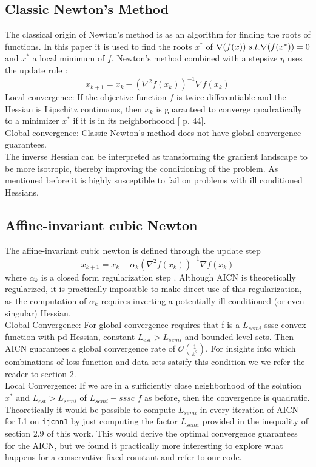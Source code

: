 \documentclass{article}
\begin{document}
\subsection{Classic Newton's Method}
The classical origin of Newton's method is as an algorithm for finding the roots of functions. In this paper it is used to find the roots $x^{*}$ of $\nabla (f(x)) \hspace{0.1cm} s.t.\nabla(f(x^{*})) = 0$ and $x^{*}$ a local minimum of $f$. Newton's method combined with a stepsize $\eta$ uses the update rule \cite{wright}:
\begin{equation}
  x_{k+1} = x_k - (\nabla^2 f(x_k))^{-1} \nabla f(x_k)
\end{equation}
Local convergence: If the objective function $f$ is twice differentiable and the Hessian is Lipschitz continuous, then $x_k$ is guaranteed to converge quadratically to a minimizer $x^*$ if it is in its neighborhoood [\cite{wright} p. 44].\\
Global convergence: Classic Newton's method does not have global convergence guarantees.\\
The inverse Hessian can be interpreted as transforming the gradient landscape to be more isotropic, thereby improving the conditioning of the problem. As mentioned before it is highly susceptible to fail on problems with ill conditioned Hessians.
\subsection{Affine-invariant cubic Newton}
The affine-invariant cubic newton is defined through the update step
\begin{equation}
  x_{k+1} = x_k - \alpha_k (\nabla^2 f(x_k))^{-1} \nabla f(x_k)
\end{equation}
where $\alpha_k$ is a closed form regularization step \cite{hanzely2022damped}. 
Although AICN is theoretically regularized, it is practically impossible to make direct use of this regularization, as the computation of $\alpha_k$ requires inverting a potentially ill conditioned (or even singular) Hessian.\\
Global Convergence:  For global convergence \cite{hanzely2022damped} requires that f is a $L_{semi}$-sssc convex function with pd Hessian, constant $L_{est}>L_{semi}$ and bounded level sets. Then AICN guarantees a global convergence rate of $\mathcal{O}(\frac{1}{k^2})$. For insights into which combinations of loss function and data sets satsify this condition we we refer the reader to section 2.\\
Local Convergence: If we are in a sufficiently close \cite{hanzely2022damped} neighborhood of the solution $x^*$ and $L_{est}>L_{semi}$ of $L_{semi}-sssc$ $f$ as before, then the convergence is quadratic.\\ 
Theoretically it would be possible to compute $L_{semi}$ in every iteration of AICN for L1 on \texttt{ijcnn1} by just computing the factor $L_{semi}$ provided in the inequality of section 2.9 of this work. This would derive the optimal convergence guarantees for the AICN, but we found it practically more interesting to explore what happens for a conservative fixed constant and refer to our code.
\end{document}
